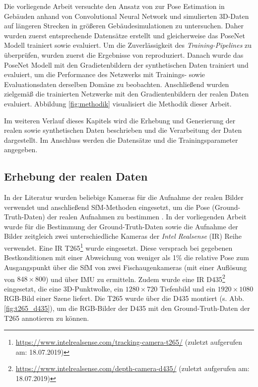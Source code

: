 Die vorliegende Arbeit versuchte den Ansatz von \citet{acharyaBIMPoseNetIndoorCamera2019} zur Pose Estimation in Gebäuden anhand von Convolutional Neural Network und simulierten 3D-Daten auf längeren Strecken in größeren Gebäudesimulationen zu untersuchen. Daher wurden zuerst entsprechende Datensätze erstellt und gleicherweise das PoseNet Modell trainiert sowie evaluiert. Um die Zuverlässigkeit des \textit{Training-Pipelines} zu überprüfen, wurden zuerst die Ergebnisse von \citet{acharyaBIMPoseNetIndoorCamera2019} reproduziert. Danach wurde das PoseNet Modell mit den Gradietenbildern der synthetischen Daten trainiert und evaluiert, um die Performance des Netzwerks mit Trainings- sowie Evaluationsdaten derselben Domäne zu beobachten. Anschließend wurden zielgemäß die trainierten Netzwerke mit den Gradientenbildern der realen Daten evaluiert. Abbildung \ref{fig:methodik} visualisiert die Methodik dieser Arbeit.


Im weiteren Verlauf dieses Kapitels wird die Erhebung und Generierung der realen sowie synthetischen Daten beschrieben und die Verarbeitung der Daten dargestellt. Im Anschluss werden die Datensätze und die Trainingsparameter angegeben. 



\subsection{Erhebung der realen Daten}
\label{subsec:record_real_data}
In der Literatur wurden beliebige Kameras für die Aufnahme der realen Bilder verwendet und anschließend SfM-Methoden eingesetzt, um die Pose (Ground-Truth-Daten) der realen Aufnahmen zu bestimmen \cite{kendallPoseNetConvolutionalNetwork2015, clarkVidLocDeepSpatioTemporal2017, acharyaBIMPoseNetIndoorCamera2019}. 
In der vorliegenden Arbeit wurde für die Bestimmung der Ground-Truth-Daten sowie die Aufnahme der Bilder zeitgleich zwei unterschiedliche Kameras der \textit{Intel Realsense} (IR) Reihe verwendet. Eine IR T265\footnote{\url{https://www.intelrealsense.com/tracking-camera-t265/} (zuletzt aufgerufen am: 18.07.2019)} wurde eingesetzt. Diese versprach bei gegebenen Bestkonditionen mit einer Abweichung von weniger als 1\% die relative Pose zum Ausgangspunkt über die SfM von zwei Fischaugenkameras (mit einer Auflösung von $848 \times 800$) und über IMU zu ermitteln. Zudem wurde eine IR D435\footnote{ \url{https://www.intelrealsense.com/depth-camera-d435/} (zuletzt aufgerufen am: 18.07.2019)} eingesetzt, die eine 3D-Punktwolke, ein $1280\times720$ Tiefenbild und ein $1920\times1080$ RGB-Bild einer Szene liefert. Die T265 wurde über die D435 montiert (s. Abb. \ref{fig:t265_d435}), um die RGB-Bilder der D435 mit den Ground-Truth-Daten der T265 annotieren zu können.

